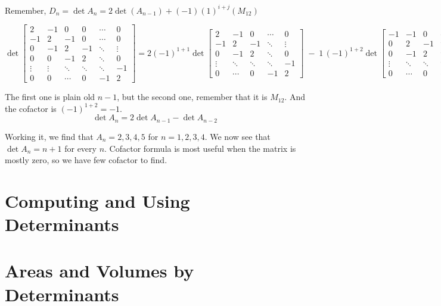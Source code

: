 Remember, \(D_n = \det A_n = 2 \det(A_{n-1}) + (-1) (1)^{i+j} (M_{12} )\)

\[
\det\!\begin{bmatrix}
2 & -1 & 0 & 0 & \cdots & 0\\
-1 & 2 & -1 & 0 & \cdots & 0\\
0 & -1 & 2 & -1 & \ddots & \vdots\\
0 & 0 & -1 & 2 & \ddots & 0\\
\vdots & \vdots & \ddots & \ddots & \ddots & -1\\
0 & 0 & \cdots & 0 & -1 & 2
\end{bmatrix}
=
2(-1)^{1+1}\!
\det\!\begin{bmatrix}
2 & -1 & 0 & \cdots & 0\\
-1 & 2 & -1 & \ddots & \vdots\\
0 & -1 & 2 & \ddots & 0\\
\vdots & \ddots & \ddots & \ddots & -1\\
0 & \cdots & 0 & -1 & 2
\end{bmatrix}
\;-\;
1\,(-1)^{1+2}\!
\det\!\begin{bmatrix}
-1 & -1 & 0 & \cdots & 0\\
0 & 2 & -1 & \ddots & \vdots\\
0 & -1 & 2 & \ddots & 0\\
\vdots & \ddots & \ddots & \ddots & -1\\
0 & \cdots & 0 & -1 & 2
\end{bmatrix}.
\]


The first one is plain old \(n - 1\), but the second one, remember that it is \(M_{12} \). And the cofactor is \((-1)^{1+2} = -1\). 
\[
  \det  A_n = 2 \det A_{n-1} - \det A_{n-2}  
\]   

Working it, we find that \(A_n = 2, 3, 4, 5\) for \(n = 1, 2, 3, 4\). We now see that \(\det A_n = n + 1\) for every \(n\). Cofactor formula is most useful when the matrix is mostly zero, so we have few cofactor to find.         

\section{Computing and Using Determinants}



\section{Areas and Volumes by Determinants}


